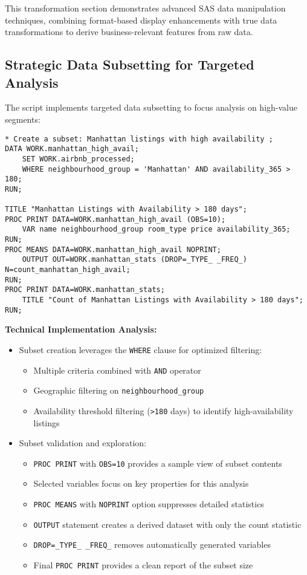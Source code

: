 \documentclass{article}
\begin{document}
This transformation section demonstrates advanced SAS data manipulation techniques, combining format-based display enhancements with true data transformations to derive business-relevant features from raw data.

\subsection{Strategic Data Subsetting for Targeted Analysis}
The script implements targeted data subsetting to focus analysis on high-value segments:

\begin{lstlisting}[style=SASStyle, caption=Specialized Data Subset Creation]
* Create a subset: Manhattan listings with high availability ;
DATA WORK.manhattan_high_avail;
    SET WORK.airbnb_processed;
    WHERE neighbourhood_group = 'Manhattan' AND availability_365 > 180;
RUN;

TITLE "Manhattan Listings with Availability > 180 days";
PROC PRINT DATA=WORK.manhattan_high_avail (OBS=10);
    VAR name neighbourhood_group room_type price availability_365;
RUN;
PROC MEANS DATA=WORK.manhattan_high_avail NOPRINT;
    OUTPUT OUT=WORK.manhattan_stats (DROP=_TYPE_ _FREQ_) N=count_manhattan_high_avail;
RUN;
PROC PRINT DATA=WORK.manhattan_stats;
    TITLE "Count of Manhattan Listings with Availability > 180 days";
RUN;
\end{lstlisting}

\noindent
\textbf{Technical Implementation Analysis:}
\begin{itemize}[leftmargin=*]
    \item Subset creation leverages the \texttt{WHERE} clause for optimized filtering:
    \begin{itemize}
        \item Multiple criteria combined with \texttt{AND} operator
        \item Geographic filtering on \texttt{neighbourhood\_group}
        \item Availability threshold filtering (\texttt{>180} days) to identify high-availability listings
    \end{itemize}

    \item Subset validation and exploration:
    \begin{itemize}
        \item \texttt{PROC PRINT} with \texttt{OBS=10} provides a sample view of subset contents
        \item Selected variables focus on key properties for this analysis
        \item \texttt{PROC MEANS} with \texttt{NOPRINT} option suppresses detailed statistics
        \item \texttt{OUTPUT} statement creates a derived dataset with only the count statistic
        \item \texttt{DROP=\_TYPE\_ \_FREQ\_} removes automatically generated variables
        \item Final \texttt{PROC PRINT} provides a clean report of the subset size
    \end{itemize}
\end{itemize}
\end{document}
